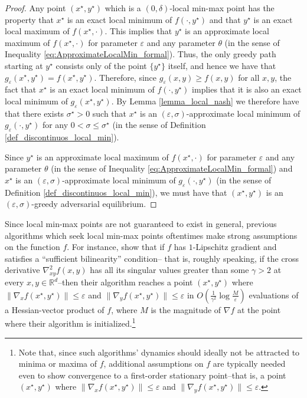 \documentclass[11pt,letterpaper]{article}
\renewcommand{\epsilon}{\varepsilon}
\newcommand{\eps}{\varepsilon}
\begin{document}
  \begin{proof}
  Any point $(x^\star, y^\star)$ which is a $(0, \delta)$-local min-max point has the property that $x^\star$ is an exact local minimum of $f(\cdot, y^\star)$ and that $y^\star$ is an exact local maximum of $f(x^\star, \cdot)$. 
    This implies that $y^\star$ is an approximate local maximum of $f(x^\star, \cdot)$ for parameter $\epsilon$ and any parameter $\theta$ (in the sense of Inequality \eqref{eq:ApproximateLocalMin_formal}).  Thus, the only greedy path starting at $y^\star$ consists only of the point $\{y^\star\}$ itself, and hence we have that $g_\epsilon(x^\star, y^\star) = f(x^\star, y^\star)$. 
    Therefore, since $g_\epsilon(x,y) \geq f(x,y)$ for all $x,y$, the fact that $x^\star$ is  an exact local minimum of  $f(\cdot, y^\star)$ implies that it is also an exact local minimum of $g_\epsilon(x^\star, y^\star)$. 
    By Lemma \ref{lemma_local_nash} we therefore have that there exists $\sigma^\star > 0$ such that $x^\star$ is an $(\eps, \sigma)$-approximate local minimum of $g_\eps(\cdot, y^\star)$ for any $0<\sigma \leq \sigma^\star$  (in the sense of Definition \ref{def_discontinuos_local_min}). 
    
    
    Since $y^\star$ is an approximate local maximum of $f(x^\star, \cdot)$ for parameter $\epsilon$ and any parameter $\theta$  (in the sense of Inequality \eqref{eq:ApproximateLocalMin_formal}) and  $x^\star$ is an $(\epsilon, \sigma)$-approximate local minimum of $g_\eps(\cdot, y^\star)$ (in the sense of Definition \ref{def_discontinuos_local_min}), we must have that $(x^\star, y^\star)$ is an $(\epsilon, \sigma)$-greedy adversarial equilibrium.
%   
  \end{proof}


\noindent
Since local min-max points are not guaranteed to exist in general, previous algorithms which seek local min-max points oftentimes make strong assumptions on the function $f$.
For instance, \cite{abernethy2019last} show that if $f$ has $1$-Lipschitz gradient and satisfies a ``sufficient bilinearity'' condition-- that is, roughly speaking, if the cross derivative $\nabla^2_{xy} f(x,y)$ has all its singular values greater than some $\gamma>2$ at every $x,y \in \mathbb{R}^d$--then their algorithm reaches a point $(x^\star, y^\star)$ where $\|\nabla_x f(x^\star, y^\star)\| \leq \epsilon$ and  $\|\nabla_y f(x^\star, y^\star)\| \leq \epsilon$ 
 in $O\left(\frac{1}{\gamma^2} \log\frac{M}{\epsilon}\right)$ evaluations of a Hessian-vector product of $f$, where $M$ is the magnitude of  $\nabla f$ at the point where their algorithm is initialized.\footnote{
Note that, since such algorithms' dynamics should ideally not be attracted to minima or maxima of $f$, additional assumptions on $f$ are typically needed even to show convergence to a first-order stationary point--that is, a point $(x^\star, y^\star)$ where $\|\nabla_x f(x^\star, y^\star)\| \leq \epsilon$ and  $\|\nabla_y f(x^\star, y^\star)\| \leq \epsilon$.}
\end{document}
